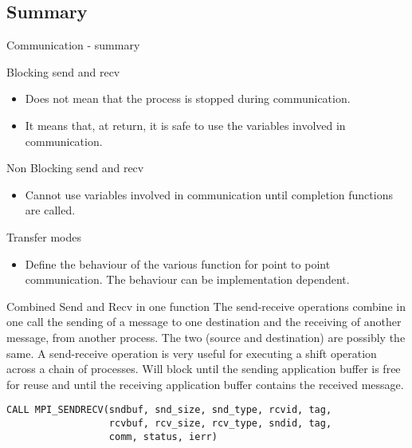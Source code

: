 \documentclass[aspectratio=43]{beamer}
\begin{document}
\subsection{Summary}
\begin{frame}{Communication - summary}
\begin{blue2block}{Blocking send and recv}
\begin{itemize}
\item Does not mean that the process is stopped during communication.
\item It means that, at return, it is safe to use the variables involved in communication.
\end{itemize}
\end{blue2block}

\begin{blue2block}{Non Blocking send and recv}
\begin{itemize}
\item Cannot use variables involved in communication until completion functions are called.
\end{itemize}
\end{blue2block}

\begin{blue2block}{Transfer modes}
\begin{itemize}
\item Define the behaviour of the various function for point to point communication. The behaviour can be implementation dependent.
\end{itemize}
\end{blue2block}
\end{frame}

\begin{frame}[fragile]{Combined Send and Recv in one function}
\justifying
The send-receive operations combine in one call the sending of a message to one destination and the receiving of another message, from another process.
The two (source and destination) are possibly the same.
A send-receive operation is very useful for executing a shift operation across a chain of processes.
Will block until the sending application buffer is free for reuse and until the receiving application buffer contains the received message.
\begin{verbatim}
CALL MPI_SENDRECV(sndbuf, snd_size, snd_type, rcvid, tag,
                  rcvbuf, rcv_size, rcv_type, sndid, tag,
                  comm, status, ierr)
\end{verbatim}
\end{frame}
\end{document}
